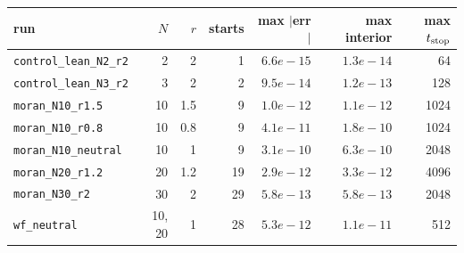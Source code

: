\begin{tabular}{lrrrrrr}
\toprule
run & $N$ & $r$ & starts & max $|$err$|$ & max interior & max $t_{\rm stop}$ \\
\midrule
\texttt{control\_lean\_N2\_r2} & 2 & 2 & 1 & $6.6e-15$ & $1.3e-14$ & 64 \\
\texttt{control\_lean\_N3\_r2} & 3 & 2 & 2 & $9.5e-14$ & $1.2e-13$ & 128 \\
\texttt{moran\_N10\_r1.5} & 10 & 1.5 & 9 & $1.0e-12$ & $1.1e-12$ & 1024 \\
\texttt{moran\_N10\_r0.8} & 10 & 0.8 & 9 & $4.1e-11$ & $1.8e-10$ & 1024 \\
\texttt{moran\_N10\_neutral} & 10 & 1 & 9 & $3.1e-10$ & $6.3e-10$ & 2048 \\
\texttt{moran\_N20\_r1.2} & 20 & 1.2 & 19 & $2.9e-12$ & $3.3e-12$ & 4096 \\
\texttt{moran\_N30\_r2} & 30 & 2 & 29 & $5.8e-13$ & $5.8e-13$ & 2048 \\
\texttt{wf\_neutral} & 10, 20 & 1 & 28 & $5.3e-12$ & $1.1e-11$ & 512 \\
\bottomrule
\end{tabular}
